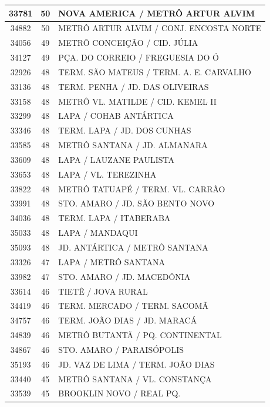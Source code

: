 \documentclass[
	12pt,				%
	oneside,			%
	a4paper,			%
	english,			%
	brazil				%
	]{abntex2ppgsi}
\begin{document}
\begin{apendicesenv}
\begin{longtable}{c|c|p{7cm}}
\hline
    33781 & 50    & NOVA AMERICA / METRÔ ARTUR ALVIM \\
\hline
    34882 & 50    & METRÔ ARTUR ALVIM / CONJ. ENCOSTA NORTE \\
\hline
    34056 & 49    & METRÔ CONCEIÇÃO / CID. JÚLIA \\
\hline
    34127 & 49    & PÇA. DO CORREIO / FREGUESIA DO Ó \\
\hline
    32926 & 48    & TERM. SÃO MATEUS / TERM. A. E. CARVALHO \\
\hline
    33136 & 48    & TERM. PENHA / JD. DAS OLIVEIRAS \\
\hline
    33158 & 48    & METRÔ VL. MATILDE / CID. KEMEL II \\
\hline
    33299 & 48    & LAPA / COHAB ANTÁRTICA \\
\hline
    33346 & 48    & TERM. LAPA / JD. DOS CUNHAS \\
\hline
    33585 & 48    & METRÔ SANTANA / JD. ALMANARA \\
\hline
    33609 & 48    & LAPA / LAUZANE PAULISTA \\
\hline
    33653 & 48    & LAPA / VL. TEREZINHA \\
\hline
    33822 & 48    & METRÔ TATUAPÉ / TERM. VL. CARRÃO \\
\hline
    33991 & 48    & STO. AMARO / JD. SÃO BENTO NOVO \\
\hline
    34036 & 48    & TERM. LAPA / ITABERABA \\
\hline
    35033 & 48    & LAPA / MANDAQUI \\
\hline
    35093 & 48    & JD. ANTÁRTICA / METRÔ SANTANA \\
\hline
    33326 & 47    & LAPA / METRÔ SANTANA \\
\hline
    33982 & 47    & STO. AMARO / JD. MACEDÔNIA \\
\hline
    33614 & 46    & TIETÊ / JOVA RURAL \\
\hline
    34419 & 46    & TERM. MERCADO / TERM. SACOMÃ \\
\hline
    34757 & 46    & TERM. JOÃO DIAS / JD. MARACÁ \\
\hline
    34839 & 46    & METRÔ BUTANTÃ / PQ. CONTINENTAL \\
\hline
    34867 & 46    & STO. AMARO / PARAISÓPOLIS \\
\hline
    35193 & 46    & JD. VAZ DE LIMA / TERM. JOÃO DIAS \\
\hline
    33440 & 45    & METRÔ SANTANA / VL. CONSTANÇA \\
\hline
    33539 & 45    & BROOKLIN NOVO / REAL PQ. \\

\end{longtable}
\end{apendicesenv}
\end{document}
